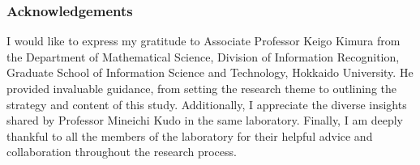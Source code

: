 \documentclass[runningheads]{llncs}
\begin{document}
\subsubsection{Acknowledgements}
I would like to express my gratitude to Associate Professor Keigo Kimura
from the Department of Mathematical Science,
Division of Information Recognition,
Graduate School of Information Science and Technology, Hokkaido University.
He provided invaluable guidance,
from setting the research theme to outlining the strategy and content of this study.
Additionally,
I appreciate the diverse insights shared by Professor Mineichi Kudo in the same laboratory.
Finally, I am deeply thankful to all the members of the laboratory
for their helpful advice and collaboration throughout the research process.

%
%
%


%
\end{document}
